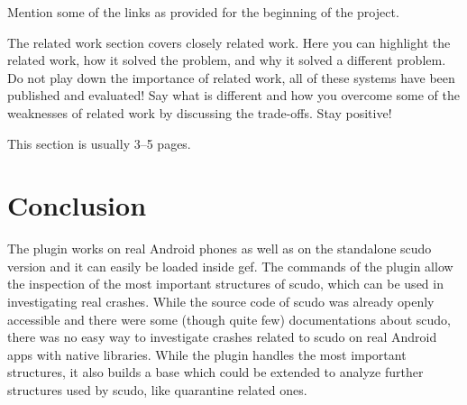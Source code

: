 \documentclass[a4paper,11pt,oneside]{report}
\begin{document}
Mention some of the links as provided for the beginning of the project.

The related work section covers closely related work. Here you can highlight
the related work, how it solved the problem, and why it solved a different
problem. Do not play down the importance of related work, all of these
systems have been published and evaluated! Say what is different and how
you overcome some of the weaknesses of related work by discussing the 
trade-offs. Stay positive!

This section is usually 3–5 pages.


\chapter{Conclusion}

The plugin works on real Android phones as well as on the standalone scudo
version and it can easily be loaded inside gef. The commands of the plugin
allow the inspection of the most important structures of scudo, which can
be used in investigating real crashes. While the source code of scudo was
already openly accessible and there were some (though quite few) documentations
about scudo, there was no easy way to investigate crashes related to scudo on
real Android apps with native libraries. While the plugin handles the most
important structures, it also builds a base which could be extended to
analyze further structures used by scudo, like quarantine related ones.

\cleardoublepage{}
\printbibliography{}

%
%
\end{document}
